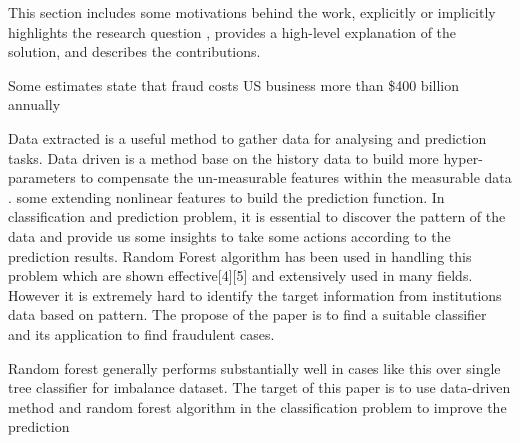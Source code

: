This section includes some motivations behind the work, explicitly or implicitly highlights the research question , provides a high-level explanation of the solution, and describes the contributions.

Some estimates state that fraud costs US business more than \$400 billion annually 

Data extracted is a useful method to gather data for analysing and prediction tasks. Data driven is a method base on the history data to build more hyper-parameters to compensate the un-measurable features within the measurable data \cite{SMARRA20181252}. some extending nonlinear features to build the prediction function. In classification and prediction problem, it is essential to discover the pattern of the data and provide us some insights to take some actions according to the prediction results. Random Forest algorithm has been used in handling this problem which are shown effective[4][5] and extensively used in many fields. However it is extremely hard to identify the target information from institutions data based on pattern. The propose of the paper is to find a suitable classifier and its application to find fraudulent cases. 

Random forest generally performs substantially well in cases like this over single tree classifier for imbalance dataset. The target of this paper is to use data-driven method and random forest algorithm in the classification problem to improve the prediction